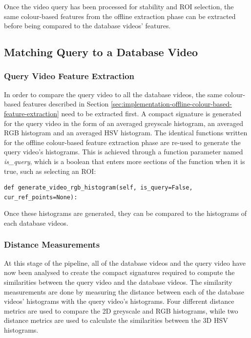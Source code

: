 Once the video query has been processed for stability and ROI selection, the same colour-based features from the offline extraction phase can be extracted before being compared to the database videos' features.


\subsection{Matching Query to a Database Video}

\subsubsection{Query Video Feature Extraction}

In order to compare the query video to all the database videos, the same colour-based features described in Section \ref{sec:implementation-offline-colour-based-feature-extraction} need to be extracted first. A compact signature is generated for the query video in the form of an averaged greyscale histogram, an averaged RGB histogram and an averaged HSV histogram. The identical functions written for the offline colour-based feature extraction phase are re-used to generate the query video's histograms. This is achieved through a function parameter named \textit{is\_query}, which is a boolean that enters more sections of the function when it is true, such as selecting an ROI:

\begin{lstlisting}
def generate_video_rgb_histogram(self, is_query=False, cur_ref_points=None):
\end{lstlisting}

Once these histograms are generated, they can be compared to the histograms of each database videos.

\subsubsection{Distance Measurements}
\label{sec:implementation-distance-measurements}

At this stage of the pipeline, all of the database videos and the query video have now been analysed to create the compact signatures required to compute the similarities between the query video and the database videos. The similarity measurements are done by measuring the distance between each of the database videos' histograms with the query video's histograms. Four different distance metrics are used to compare the 2D greyscale and RGB histograms, while two distance metrics are used to calculate the similarities between the 3D HSV histograms.\\


